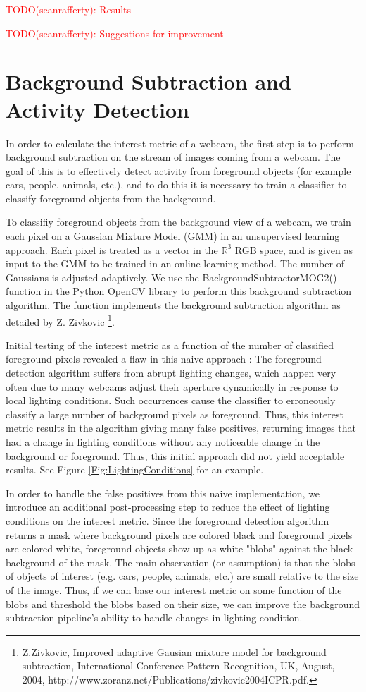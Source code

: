 \documentclass{article}
\begin{document}
\textcolor{red}{TODO(seanrafferty): Results}

\textcolor{red}{TODO(seanrafferty): Suggestions for improvement}


\section{Background Subtraction and Activity Detection}
In order to calculate the interest metric of a webcam, the first step is to
perform background subtraction on the stream of images coming from a webcam.
The goal of this is to effectively detect activity from foreground objects (for
example cars, people, animals, etc.), and to do this it is necessary to train a
classifier to classify foreground objects from the background.

To classifiy foreground objects from the background view of a webcam, we train
each pixel on a Gaussian Mixture Model (GMM) in an unsupervised learning
approach. Each pixel is treated as a vector in the $\mathbb{R}^3$ RGB space,
and is given as input to the GMM to be trained in an online learning method.
The number of Gaussians is adjusted adaptively. We use the
BackgroundSubtractorMOG2() function in the Python OpenCV library to perform
this background subtraction algorithm. The function implements the background
subtraction algorithm as detailed by Z. Zivkovic \footnote{Z.Zivkovic, Improved
adaptive Gausian mixture model for background subtraction, International
Conference Pattern Recognition, UK, August, 2004,
http://www.zoranz.net/Publications/zivkovic2004ICPR.pdf.}.

Initial testing of the interest metric as a function of the number of
classified foreground pixels revealed a flaw in this naive approach : The
foreground detection algorithm suffers from abrupt lighting changes, which
happen very often due to many webcams adjust their aperture dynamically in
response to local lighting conditions. Such occurrences cause the classifier to
erroneously classify a large number of background pixels as foreground. Thus,
this interest metric results in the algorithm giving many false positives,
returning images that had a change in lighting conditions without any
noticeable change in the background or foreground. Thus, this initial approach
did not yield acceptable results. See Figure \ref{Fig:LightingConditions} for
an example.

In order to handle the false positives from this naive implementation, we
introduce an additional post-processing step to reduce the effect of lighting
conditions on the interest metric. Since the foreground detection algorithm
returns a mask where background pixels are colored black and foreground pixels
are colored white, foreground objects show up as white "blobs" against the
black background of the mask. The main observation (or assumption) is that the
blobs of objects of interest (e.g. cars, people, animals, etc.) are small
relative to the size of the image. Thus, if we can base our interest metric on
some function of the blobs and threshold the blobs based on their size, we can
improve the background subtraction pipeline's ability to handle changes in
lighting condition.
\end{document}
